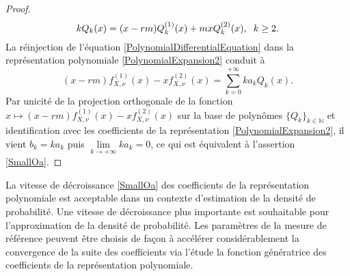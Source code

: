 \begin{proof}
\begin{equation}\label{PolynomialDifferentialEquation}
kQ_{k}(x)=(x-rm)Q_{k}^{(1)}(x)+mxQ_{k}^{(2)}(x),\hspace{0.2cm}k\geq2.
\end{equation}
La réinjection de l\rq{}équation \eqref{PolynomialDifferentialEquation} dans la représentation polynomiale \eqref{PolynomialExpansion2} conduit à 
\begin{equation}\label{PolynomialExpansion4}
(x-rm)f^{(1)}_{X,\nu}(x)-xf^{(2)}_{X,\nu}(x)=\sum_{k=0}^{+\infty}ka_{k}Q_{k}(x).
\end{equation}
Par unicité de la projection orthogonale de la fonction $x\mapsto (x-rm)f^{(1)}_{X,\nu}(x)-x f^{(2)}_{X,\nu}(x)$  sur la base de polynômes $\{Q_{k}\}_{k\in\mathbb{N}}$ et identification avec les coefficients de la représentation \eqref{PolynomialExpansion2}, il vient $b_{k}=ka_{k}$ puis $\underset{k\rightarrow+\infty}{\lim} ka_{k}=0$, ce qui est équivalent à l\rq{}assertion \eqref{SmallOa}.
\end{proof}
La vitesse de décroissance \eqref{SmallOa} des coefficients de la représentation polynomiale est acceptable dans un contexte d\rq{}estimation de la densité de probabilité. Une vitesse de décroissance plus importante est souhaitable pour l\rq{}approximation de la densité de probabilité. Les paramètres de la mesure de référence peuvent être choisis de façon à accélérer considérablement la convergence de la suite des coefficients via l\rq{}étude la fonction génératrice des coefficients de la représentation polynomiale.\\

